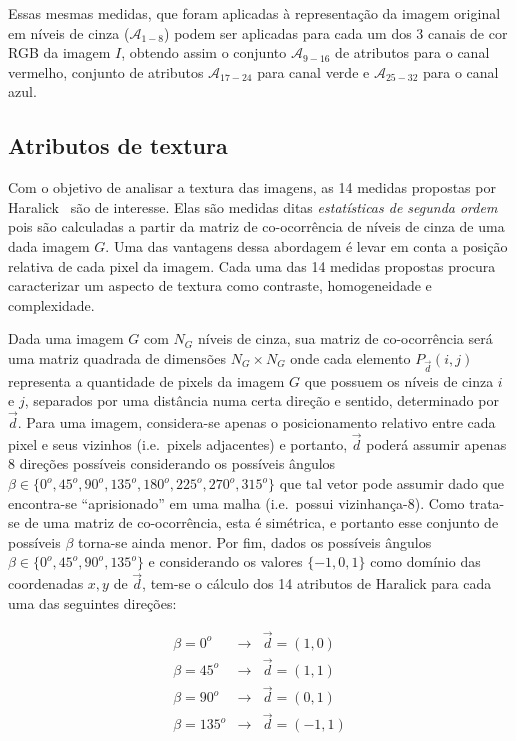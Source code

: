 Essas mesmas medidas, que foram aplicadas à representação da imagem original em
níveis de cinza ($\mathcal{A}_{1-8}$) podem ser aplicadas para cada um dos
3 canais de cor RGB da imagem $I$, obtendo assim o conjunto
$\mathcal{A}_{9-16}$ de atributos para o canal vermelho, conjunto de atributos
$\mathcal{A}_{17-24}$ para canal verde e $\mathcal{A}_{25-32}$ para o canal
azul.

\subsection{Atributos de textura}

Com o objetivo de analisar a textura das imagens, as 14 medidas propostas por
Haralick~\cite{haralick} são de interesse. Elas são medidas ditas
\emph{estatísticas de segunda ordem} pois são calculadas a partir da matriz de
co-ocorrência de níveis de cinza de uma dada imagem $G$. Uma das vantagens dessa
abordagem é levar em conta a posição relativa de cada pixel da imagem. Cada uma
das 14 medidas propostas procura caracterizar um aspecto de textura como
contraste, homogeneidade e complexidade.

Dada uma imagem $G$ com $N_G$ níveis de cinza, sua matriz de co-ocorrência será
uma matriz quadrada de dimensões $N_G \times N_G$ onde cada elemento $P_{\vec{d}}(i,j)$ representa
a quantidade de pixels da imagem $G$ que possuem os níveis de cinza $i$ e $j$,
separados por uma distância numa certa direção e sentido, determinado por
$\vec{d}$. Para uma imagem, considera-se apenas o posicionamento relativo entre
cada pixel e seus vizinhos (i.e.\ pixels adjacentes) e portanto, $\vec{d}$
poderá assumir apenas 8 direções possíveis considerando os possíveis ângulos
$\beta \in \{0^o, 45^o, 90^o, 135^o, 180^o, 225^o, 270^o, 315^o\}$ que tal
vetor pode assumir dado que encontra-se ``aprisionado'' em uma malha
(i.e.\ possui vizinhança-8). Como
trata-se de uma matriz de co-ocorrência, esta é simétrica, e portanto esse
conjunto de possíveis $\beta$ torna-se ainda menor. Por fim, dados os possíveis
ângulos $\beta \in \{0^o, 45^o, 90^o, 135^o\}$ e considerando os valores $\{-1,
0, 1\}$ como domínio das coordenadas $x,y$ de $\vec{d}$, tem-se o cálculo dos 14
atributos de Haralick para cada uma das seguintes direções:

\begin{eqnarray}
  \beta = 0^o & \to & \vec{d} = (1, 0) \\
  \beta = 45^o & \to & \vec{d} = (1, 1) \\
  \beta = 90^o & \to & \vec{d} = (0, 1) \\
  \beta = 135^o & \to & \vec{d} = (-1, 1)
\end{eqnarray}

